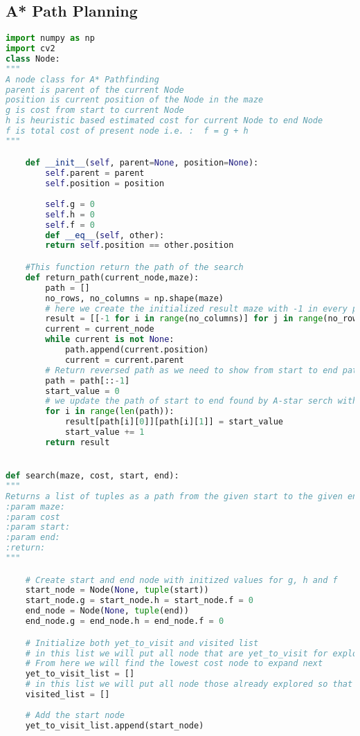 \begin{appendices}
\section{A* Path Planning}
\begin{lstlisting}[language=Python]
import numpy as np
import cv2
class Node:
"""
A node class for A* Pathfinding
parent is parent of the current Node
position is current position of the Node in the maze
g is cost from start to current Node
h is heuristic based estimated cost for current Node to end Node
f is total cost of present node i.e. :  f = g + h
"""

	def __init__(self, parent=None, position=None):
		self.parent = parent
		self.position = position
		
		self.g = 0
		self.h = 0
		self.f = 0
		def __eq__(self, other):
		return self.position == other.position

	#This function return the path of the search
	def return_path(current_node,maze):
		path = []
		no_rows, no_columns = np.shape(maze)
		# here we create the initialized result maze with -1 in every position
		result = [[-1 for i in range(no_columns)] for j in range(no_rows)]
		current = current_node
		while current is not None:
			path.append(current.position)
			current = current.parent
		# Return reversed path as we need to show from start to end path
		path = path[::-1]
		start_value = 0
		# we update the path of start to end found by A-star serch with every step incremented by 1
		for i in range(len(path)):
			result[path[i][0]][path[i][1]] = start_value
			start_value += 1
		return result


def search(maze, cost, start, end):
"""
Returns a list of tuples as a path from the given start to the given end in the given maze
:param maze:
:param cost
:param start:
:param end:
:return:
"""

	# Create start and end node with initized values for g, h and f
	start_node = Node(None, tuple(start))
	start_node.g = start_node.h = start_node.f = 0
	end_node = Node(None, tuple(end))
	end_node.g = end_node.h = end_node.f = 0

	# Initialize both yet_to_visit and visited list
	# in this list we will put all node that are yet_to_visit for exploration.
	# From here we will find the lowest cost node to expand next
	yet_to_visit_list = []
	# in this list we will put all node those already explored so that we don't explore it again
	visited_list = []
	
	# Add the start node
	yet_to_visit_list.append(start_node)
	

\end{lstlisting}
\end{appendices}
